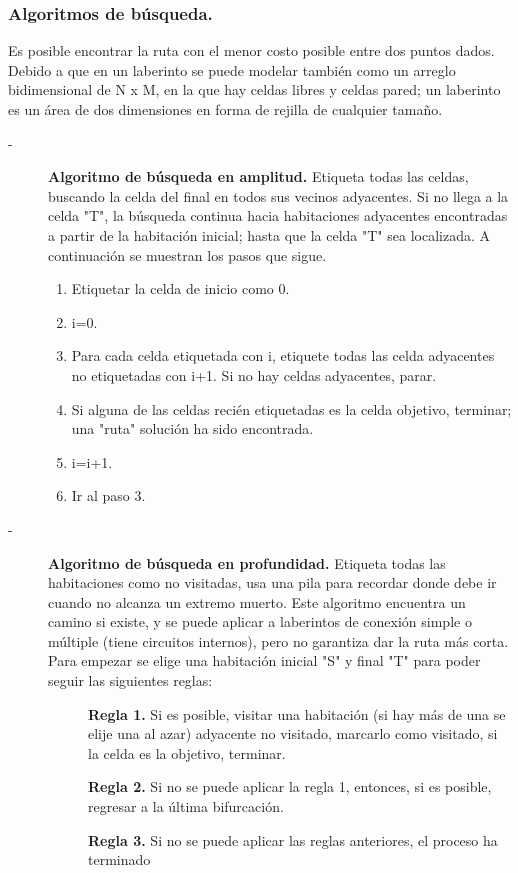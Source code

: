 	\subsubsection*{Algoritmos de búsqueda.}
	\noindent Es posible encontrar la ruta con el menor costo posible entre dos puntos dados. Debido a que en un laberinto se puede modelar también como un arreglo bidimensional de N x M, en la que hay celdas libres y celdas pared; un laberinto es un área de dos dimensiones en forma de rejilla de cualquier tamaño.
	\begin{description}
	    \item[-]\textbf{Algoritmo de búsqueda en amplitud.} Etiqueta todas las celdas, buscando la celda del final en todos sus vecinos adyacentes. Si no llega a la celda "T", la búsqueda continua hacia habitaciones adyacentes encontradas a partir de la habitación inicial; hasta que la celda "T" sea localizada. A continuación se muestran los pasos que sigue.
	    \begin{enumerate}
	        \item Etiquetar la celda de inicio como 0.
	        \item i=0.
	        \item Para cada celda etiquetada con i, etiquete todas las celda adyacentes no etiquetadas con i+1. Si no hay celdas adyacentes, parar.
	        \item Si alguna de las celdas recién etiquetadas es la celda objetivo, terminar; una "ruta" solución ha sido encontrada.
	        \item i=i+1.
	        \item Ir al paso 3.
	    \end{enumerate}
	    
	    \item[-]\textbf{Algoritmo de búsqueda en profundidad.} Etiqueta todas las habitaciones como no visitadas, usa una pila para recordar donde debe ir cuando no alcanza un extremo muerto. Este algoritmo encuentra un camino si existe, y se puede aplicar a laberintos de conexión simple o múltiple (tiene circuitos internos), pero no garantiza dar la ruta más corta. Para empezar se elige una habitación inicial "S" y final "T" para poder seguir las siguientes reglas:
	    \begin{description}
	        \item[ ]\textbf{Regla 1.} Si es posible, visitar una habitación (si hay más de una se elije una al azar) adyacente no visitado, marcarlo como visitado, si la celda es la objetivo, terminar.
	        \item[ ]\textbf{Regla 2.} Si no se puede aplicar la regla 1, entonces, si es posible, regresar a la última bifurcación.
	        \item[ ]\textbf{Regla 3.} Si no se puede aplicar las reglas anteriores, el proceso ha terminado
	    \end{description}
	

\end{description}
